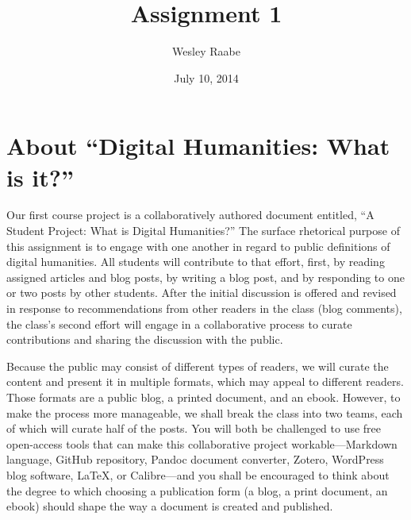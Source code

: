 \documentclass[]{article}
\title{Assignment 1}
\author{Wesley Raabe}
\date{July 10, 2014}
\begin{document}
\maketitle

\section{About ``Digital Humanities: What is
it?''}\label{about-digital-humanities-what-is-it}

Our first course project is a collaboratively authored document
entitled, ``A Student Project: What is Digital Humanities?'' The surface
rhetorical purpose of this assignment is to engage with one another in
regard to public definitions of digital humanities. All students will
contribute to that effort, first, by reading assigned articles and blog
posts, by writing a blog post, and by responding to one or two posts by
other students. After the initial discussion is offered and revised in
response to recommendations from other readers in the class (blog
comments), the class's second effort will engage in a collaborative
process to curate contributions and sharing the discussion with the
public.

Because the public may consist of different types of readers, we will
curate the content and present it in multiple formats, which may appeal
to different readers. Those formats are a public blog, a printed
document, and an ebook. However, to make the process more manageable, we
shall break the class into two teams, each of which will curate half of
the posts. You will both be challenged to use free open-access tools
that can make this collaborative project workable---Markdown language,
GitHub repository, Pandoc document converter, Zotero, WordPress blog
software, LaTeX, or Calibre---and you shall be encouraged to think about
the degree to which choosing a publication form (a blog, a print
document, an ebook) should shape the way a document is created and
published.
\end{document}
